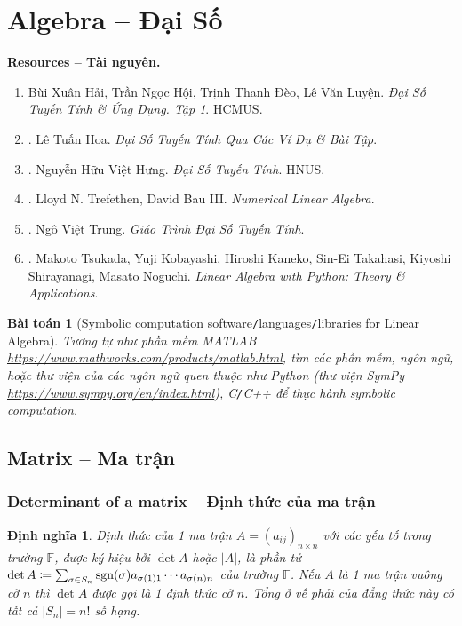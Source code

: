 \documentclass{article}
\newtheorem{baitoan}{Bài toán}
\newtheorem{dinhnghia}{Định nghĩa}
\begin{document}
\section{Algebra -- Đại Số}
\label{sect: algebra}
\textbf{\textsf{Resources -- Tài nguyên.}}
\begin{enumerate}
	\item {\sc Bùi Xuân Hải, Trần Ngọc Hội, Trịnh Thanh Đèo, Lê Văn Luyện}. {\it Đại Số Tuyến Tính \& Ứng Dụng. Tập 1}. HCMUS.
	\item \cite{Hoa_linear_algebra}. {\sc Lê Tuấn Hoa}. {\it Đại Số Tuyến Tính Qua Các Ví Dụ \& Bài Tập}.
	\item \cite{Hung_linear_algebra}. {\sc Nguyễn Hữu Việt Hưng}. {\it Đại Số Tuyến Tính}. HNUS.
	\item \cite{Trefethen_Bau1997,Trefethen_Bau2022}. {\sc Lloyd N. Trefethen, David Bau III}. {\it Numerical Linear Algebra}.
	\item \cite{Trung_linear_algebra}. {\sc Ngô Việt Trung}. {\it Giáo Trình Đại Số Tuyến Tính}.
	\item \cite{Tsukada_Kobayashi_Kaneko_Takahasi_Shirayanagi_Noguchi2023}. {\sc Makoto Tsukada, Yuji Kobayashi, Hiroshi Kaneko, Sin-Ei Takahasi, Kiyoshi Shirayanagi, Masato Noguchi}. {\it Linear Algebra with Python: Theory \& Applications}.
\end{enumerate}

\begin{baitoan}[Symbolic computation software{\tt/}languages{\tt/}libraries for Linear Algebra]
	Tương tự như phần mềm {\sf MATLAB} \url{https://www.mathworks.com/products/matlab.html}, tìm các phần mềm, ngôn ngữ, hoặc thư viện của các ngôn ngữ quen thuộc như {\sf Python} (thư viện {\sf SymPy} \url{https://www.sympy.org/en/index.html}), {\sf C{\tt/}C++} để thực hành symbolic computation.
\end{baitoan}


\subsection{Matrix -- Ma trận}

\subsubsection{Determinant of a matrix -- Định thức của ma trận}
\begin{dinhnghia}
	{\rm Định thức} của 1 ma trận $A = (a_{ij})_{n\times n}$ với các yếu tố trong trường $\mathbb{F}$, được ký hiệu bởi $\det A$ hoặc $|A|$, là phần tử $\det A\coloneqq\sum_{\sigma\in S_n} {\rm sgn}(\sigma)a_{\sigma(1)1}\cdots a_{\sigma(n)n}$ của trường $\mathbb{F}$. Nếu $A$ là 1 ma trận vuông cỡ $n$ thì $\det A$ được gọi là 1 {\rm định thức cỡ $n$}. Tổng ở vế phải của đẳng thức này có tất cả $|S_n| = n!$ số hạng.
\end{dinhnghia}
\end{document}
